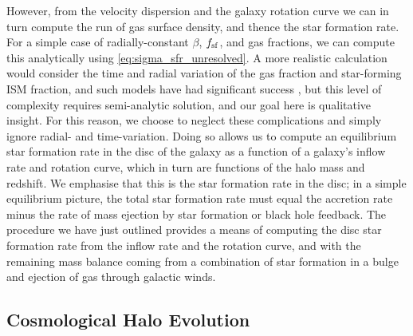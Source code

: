 \documentclass[useAMS,usenatbib]{mn2e}
\begin{document}
However, from the velocity dispersion and the galaxy rotation curve we can in turn compute the run of gas surface density, and thence the star formation rate. For a simple case of radially-constant $\beta$, $f_{\rm sf}$, and gas fractions, we can compute this analytically using \autoref{eq:sigma_sfr_unresolved}. A more realistic calculation would consider the time and radial variation of the gas fraction and star-forming ISM fraction, and such models have had significant success \citep[e.g.,][]{forbes12a, forbes14a, tonini16a}, but this level of complexity requires semi-analytic solution, and our goal here is qualitative insight. For this reason, we choose to neglect these complications and simply ignore radial- and time-variation. Doing so allows us to compute an equilibrium star formation rate in the disc of the galaxy as a function of a galaxy's inflow rate and rotation curve, which in turn are functions of the halo mass and redshift. We emphasise that this is the star formation rate in the disc; in a simple equilibrium picture, the total star formation rate must equal the accretion rate minus the rate of mass ejection by star formation or black hole feedback. The procedure we have just outlined provides a means of computing the disc star formation rate from the inflow rate and the rotation curve, and with the remaining mass balance coming from a combination of star formation in a bulge and ejection of gas through galactic winds.


\subsection{Cosmological Halo Evolution}
\label{ssec:halo_evol}
\end{document}
